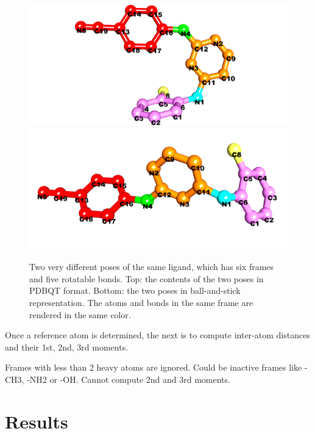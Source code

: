 \documentclass[twocolumn]{svjour3}          %
\begin{document}
\begin{figure}
\endminipage
\\
\centering
\includegraphics[width=1.36\textwidth,natwidth=1904,natheight=894]{../usrt/T27Crystal.png}
\endminipage
{}
\centering
\includegraphics[width=1.36\textwidth,natwidth=1904,natheight=894]{../usrt/T27Docked.png}
\endminipage
\caption{Two very different poses of the same ligand, which has six frames and five rotatable bonds. Top: the contents of the two poses in PDBQT format. Bottom: the two poses in ball-and-stick representation. The atoms and bonds in the same frame are rendered in the same color.}
\label{fig:T27}
\end{figure}

Once a reference atom is determined, the next is to compute inter-atom distances and their 1st, 2nd, 3rd moments.

Frames with less than 2 heavy atoms are ignored. Could be inactive frames like -CH3, -NH2 or -OH. Cannot compute 2nd and 3rd moments.

\section{Results}
\end{document}
